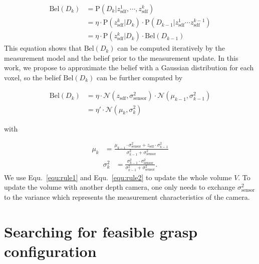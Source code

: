 \begin{equation}
\begin{split}
\text{Bel}(D_{k}) &= \text{P}(D_{k} | z_\text{sdf}^1,\cdots, z_\text{sdf}^k) \\
                  &= \eta \cdot \text{P}(z_\text{sdf}^k | D_{k} ) \cdot  \text{P}(D_{k-1}|z_\text{sdf}^1\cdots z_\text{sdf}^{k-1} )  \\
                  &= \eta \cdot \text{P}(z_\text{sdf}^k | D_{k} ) \cdot \text{Bel}(D_{k-1})
  \end{split}
\end{equation}   
This equation shows that $\text{Bel}(D_{k})$ can be computed iteratively by the measurement model and the belief prior to the measurement update. In this work, we propose to approximate the belief with a Gaussian distribution for each voxel, so the belief  $\text{Bel}(D_{k})$ can be further computed by 

\begin{equation}
\begin{split}
\text{Bel}(D_{k}) &= \eta \cdot \mathcal{N}(z_\text{sdf},  \sigma_\text{sensor}^2) \cdot  \mathcal{N}( \mu_{k-1} ,   \sigma_{k-1} ^2) \\
&= \eta' \cdot \mathcal{N}( \mu_{k} ,   \sigma_{k} ^2)
  \end{split}
\end{equation}   

with 

\begin{equation}
\label{equ:rule1}
\begin{split}
  {\mu}_{k} &= \frac{{\mu}_{k-1}\cdot\sigma_\text{sensor}^{2}+  z_\text{sdf} \cdot\sigma_{k-1}^{2}}{\sigma_{k-1}^{2}+\sigma_\text{sensor}^2}
\end{split}
\end{equation}
%
\begin{equation}
\label{equ:rule2}
\begin{split}
  \sigma_{k}^{2} &=\frac{\sigma_{k-1}^{2}\cdot\sigma_\text{sensor}^2}{\sigma_{k-1}^{2}+\sigma_\text{sensor}^2}.
\end{split}
\end{equation}
We use Equ.~\ref{equ:rule1} and Equ.~\ref{equ:rule2} to update the whole volume $V$. To update the volume with another depth camera, one only needs to exchange $\sigma_\text{sensor}^2$ to the variance which represents the measurement characteristics of the camera. 



\section{Searching for feasible grasp configuration}

